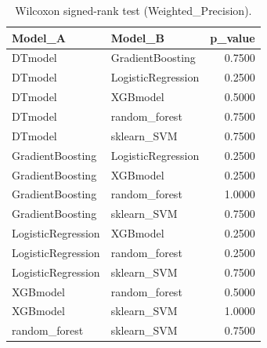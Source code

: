 \begin{table}[t]
\centering
\begin{tabular}{llr}
\toprule
Model_A & Model_B & p_value \\
\midrule
DTmodel & GradientBoosting & 0.7500 \\
DTmodel & LogisticRegression & 0.2500 \\
DTmodel & XGBmodel & 0.5000 \\
DTmodel & random_forest & 0.7500 \\
DTmodel & sklearn_SVM & 0.7500 \\
GradientBoosting & LogisticRegression & 0.2500 \\
GradientBoosting & XGBmodel & 0.2500 \\
GradientBoosting & random_forest & 1.0000 \\
GradientBoosting & sklearn_SVM & 0.7500 \\
LogisticRegression & XGBmodel & 0.2500 \\
LogisticRegression & random_forest & 0.2500 \\
LogisticRegression & sklearn_SVM & 0.7500 \\
XGBmodel & random_forest & 0.5000 \\
XGBmodel & sklearn_SVM & 1.0000 \\
random_forest & sklearn_SVM & 0.7500 \\
\bottomrule
\end{tabular}
\caption{Wilcoxon signed-rank test (Weighted_Precision).}
\label{tab:wilcoxon_Weighted_Precision}
\end{table}